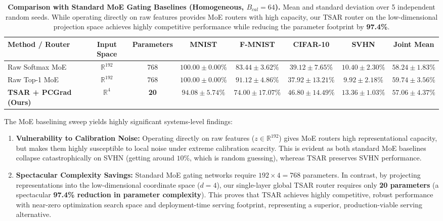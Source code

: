 \begin{table}[t]
\caption{\textbf{Comparison with Standard MoE Gating Baselines (Homogeneous, $B_{cal}=64$).} Mean and standard deviation over 5 independent random seeds. While operating directly on raw features provides MoE routers with high capacity, our TSAR router on the low-dimensional projection space achieves highly competitive performance while reducing the parameter footprint by \textbf{97.4\%}.}
\label{tab:moe_baseline_table}
\vskip 0.15in
\begin{center}
\begin{sc}
\begin{scriptsize}
\setlength{\tabcolsep}{3pt}
\begin{tabular}{lccccccc}
\toprule
Method / Router & Input Space & Parameters & MNIST & F-MNIST & CIFAR-10 & SVHN & Joint Mean \\
\midrule
Raw Softmax MoE & $\mathbb{R}^{192}$ & 768 & $100.00 \pm 0.00\%$ & $83.44 \pm 3.62\%$ & $39.12 \pm 7.65\%$ & $10.40 \pm 2.30\%$ & $58.24 \pm 1.83\%$ \\
Raw Top-1 MoE & $\mathbb{R}^{192}$ & 768 & $100.00 \pm 0.00\%$ & $91.12 \pm 4.86\%$ & $37.92 \pm 13.21\%$ & $9.92 \pm 2.18\%$ & $59.74 \pm 3.56\%$ \\
\midrule
\textbf{TSAR + PCGrad (Ours)} & $\mathbb{R}^4$ & \textbf{20} & $94.08 \pm 5.74\%$ & $74.00 \pm 17.07\%$ & $46.80 \pm 14.49\%$ & $13.36 \pm 1.03\%$ & $57.06 \pm 4.37\%$ \\
\bottomrule
\end{tabular}
\end{scriptsize}
\end{sc}
\end{center}
\vskip -0.1in
\end{table}

The MoE baselining sweep yields highly significant systems-level findings:
\begin{enumerate}
    \item \textbf{Vulnerability to Calibration Noise:} Operating directly on raw features ($z \in \mathbb{R}^{192}$) gives MoE routers high representational capacity, but makes them highly susceptible to local noise under extreme calibration scarcity. This is evident as both standard MoE baselines collapse catastrophically on SVHN (getting around $10\%$, which is random guessing), whereas TSAR preserves SVHN performance.
    \item \textbf{Spectacular Complexity Savings:} Standard MoE gating networks require $192 \times 4 = 768$ parameters. In contrast, by projecting representations into the low-dimensional coordinate space ($d=4$), our single-layer global TSAR router requires only \textbf{20 parameters} (a spectacular \textbf{97.4\% reduction in parameter complexity}). This proves that TSAR achieves highly competitive, robust performance with near-zero optimization search space and deployment-time serving footprint, representing a superior, production-viable serving alternative.
\end{enumerate}


